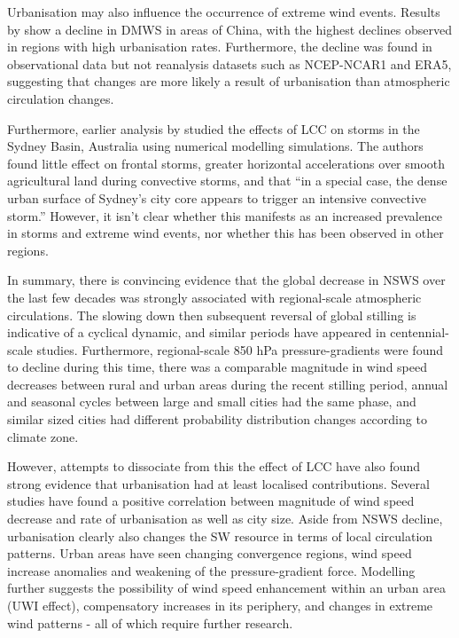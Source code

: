 Urbanisation may also influence the occurrence of extreme wind events. Results by \citet{zhang2020, zhang2022} show a decline in \ac{DMWS} in areas of China, with the highest declines observed in regions with high urbanisation rates. Furthermore, the decline was found in observational data but not reanalysis datasets such as NCEP-NCAR1 and \ac{ERA5}, suggesting that changes are more likely a result of urbanisation than atmospheric circulation changes.

Furthermore, earlier analysis by \citet{gero2006} studied the effects of \ac{LCC} on storms in the Sydney Basin, Australia using numerical modelling simulations. The authors found little effect on frontal storms, greater horizontal accelerations over smooth agricultural land during convective storms, and that “in a special case, the dense urban surface of Sydney’s city core appears to trigger an intensive convective storm.” However, it isn’t clear whether this manifests as an increased prevalence in storms and extreme wind events, nor whether this has been observed in other regions.

In summary, there is convincing evidence that the global decrease in \ac{NSWS} over the last few decades was strongly associated with regional-scale atmospheric circulations. The slowing down then subsequent reversal of global stilling is indicative of a cyclical dynamic, and similar periods have appeared in centennial-scale studies. Furthermore, regional-scale 850 hPa pressure-gradients were found to decline during this time, there was a comparable magnitude in wind speed decreases between rural and urban areas during the recent stilling period, annual and seasonal cycles between large and small cities had the same phase, and similar sized cities had different probability distribution changes according to climate zone.

However, attempts to dissociate from this the effect of \ac{LCC} have also found strong evidence that urbanisation had at least localised contributions. Several studies have found a positive correlation between magnitude of wind speed decrease and rate of urbanisation as well as city size. Aside from \ac{NSWS} decline, urbanisation clearly also changes the SW resource in terms of local circulation patterns. Urban areas have seen changing convergence regions, wind speed increase anomalies and weakening of the pressure-gradient force. Modelling further suggests the possibility of wind speed enhancement within an urban area (\ac{UWI} effect), compensatory increases in its periphery, and changes in extreme wind patterns - all of which require further research.

